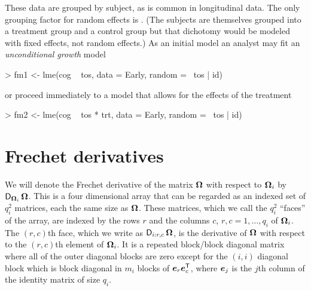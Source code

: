\documentclass[12pt]{article}
\begin{document}
These data are grouped by subject, as is common in longitudinal data.
The only grouping factor for random effects is .  (The
subjects are themselves grouped into a treatment group and a control
group but that dichotomy would be modeled with fixed effects, not
random effects.)  As an initial model an analyst may fit an
\emph{unconditional growth} model~\cite[ch.~4]{Sing:Will:2003}
\begin{Schunk}
\begin{Sinput}
> fm1 <- lme(cog ~ tos, data = Early, random = ~tos | id)
\end{Sinput}
\end{Schunk}
or proceed immediately to a model that allows for the effects of the
treatment 
\begin{Schunk}
\begin{Sinput}
> fm2 <- lme(cog ~ tos * trt, data = Early, random = ~tos | id)
\end{Sinput}
\end{Schunk}

\section{Frechet derivatives}
\label{sec:Frechet}

We will denote the Frechet derivative of the matrix $\bm{\Omega}$ with
respect to $\bm{\Omega}_i$ by $\operatorname{\mathsf{D}}_{\bm{\Omega}_i}\bm{\Omega}$.  This is a four
dimensional array that can be regarded as an indexed set of $q_i^2$
matrices, each the same size as $\bm{\Omega}$.  These matrices, which we
call the $q_i^2$ ``faces'' of the array, are indexed by the rows $r$
and the columns $c$, $r,c=1,\dots,q_i$ of $\bm{\Omega}_i$.  The $(r,c)$th
face, which we write as $\operatorname{\mathsf{D}}_{i:r,c}\bm{\Omega}$, is the derivative of
$\bm{\Omega}$ with respect to the $(r,c)$th element of $\bm{\Omega}_i$. It is
a repeated block/block diagonal matrix where all of the outer diagonal
blocks are zero except for the $(i,i)$ diagonal block which is block
diagonal in $m_i$ blocks of $\bm{e}_r\bm{e}_c^\mathsf{T}$, where $\bm{e}_j$ is
the $j$th column of the identity matrix of size $q_i$.
\end{document}
